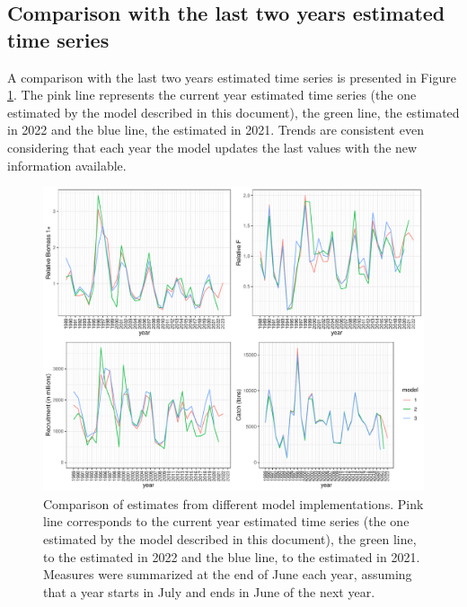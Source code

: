 \documentclass[review]{elsarticle}
\begin{document}
\subsection{Comparison with the last two years estimated time series}

A comparison with the last two years estimated time series is presented in Figure \ref{modelcomp}. The pink line represents the current year estimated time series (the one estimated by the model described in this document), the green line, the estimated in 2022 and the blue line, the estimated in 2021. Trends are consistent even considering that each year the model updates the last values with the new information available. %

\begin{figure}[h!]
 \centering
 \includegraphics{./ICESplots_modelcomp.pdf}
 \caption{Comparison of estimates from different model implementations. Pink line corresponds to the current year estimated time series (the one estimated by the model described in this document), the green line, to the estimated in 2022 and the blue line, to the estimated in 2021. Measures were summarized at the end of June each year, assuming that a year starts in July and ends in June of the next year.}
 \label{modelcomp}
\end{figure}
% 
\end{document}

